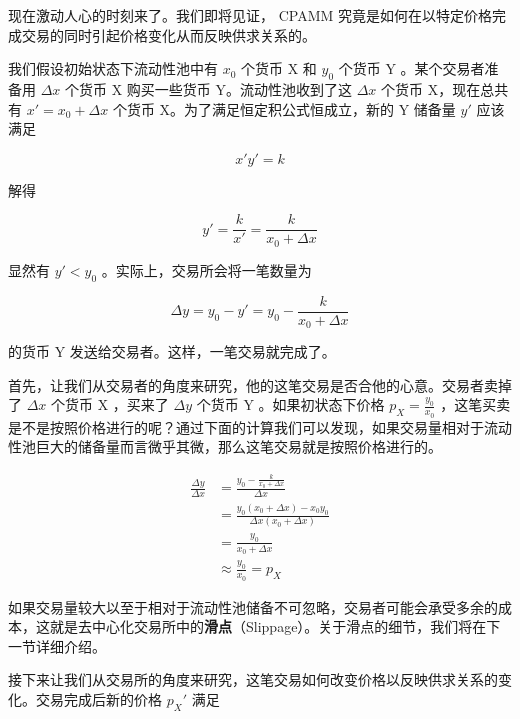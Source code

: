 \documentclass[12pt, a4paper, oneside]{ctexart}
\begin{document}
现在激动人心的时刻来了。我们即将见证， CPAMM 究竟是如何在以特定价格完成交易的同时引起价格变化从而反映供求关系的。

我们假设初始状态下流动性池中有 $x_0$ 个货币 X 和 $y_0$ 个货币 Y 。某个交易者准备用 $\Delta x$ 个货币 X 购买一些货币 Y。流动性池收到了这 $\Delta x$ 个货币 X，现在总共有 $x'=x_0+\Delta x$ 个货币 X。为了满足恒定积公式恒成立，新的 Y 储备量 $y'$ 应该满足

\begin{equation}
    x'y'=k
\end{equation}

\noindent 解得

\begin{equation}
    y'=\frac{k}{x'}=\frac{k}{x_0+\Delta x}
\end{equation}

\noindent 显然有 $y' < y_0$ 。实际上，交易所会将一笔数量为

\begin{equation}
    \Delta y = y_0 - y' = y_0 - \frac{k}{x_0+\Delta x}
\end{equation}

\noindent 的货币 Y 发送给交易者。这样，一笔交易就完成了。

首先，让我们从交易者的角度来研究，他的这笔交易是否合他的心意。交易者卖掉了 $\Delta x$ 个货币 X ，买来了 $\Delta y$ 个货币 Y 。如果初状态下价格 $\displaystyle p_X = \frac{y_0}{x_0}$ ，这笔买卖是不是按照价格进行的呢？通过下面的计算我们可以发现，如果交易量相对于流动性池巨大的储备量而言微乎其微，那么这笔交易就是按照价格进行的。

\begin{equation}
\begin{aligned}
    \frac{\Delta y}{\Delta x} 
    & = \frac{y_0-\frac{k}{x_0+\Delta x}}{\Delta x} \\
    & = \frac{y_0 (x_0+\Delta x) - x_0y_0}{\Delta x (x_0+\Delta x)} \\
    & = \frac{y_0}{x_0 + \Delta x} \\
    & \approx \frac{y_0}{x_0} = p_X
\end{aligned}
\end{equation}

如果交易量较大以至于相对于流动性池储备不可忽略，交易者可能会承受多余的成本，这就是去中心化交易所中的\textbf{滑点}（Slippage）。关于滑点的细节，我们将在下一节详细介绍。

接下来让我们从交易所的角度来研究，这笔交易如何改变价格以反映供求关系的变化。交易完成后新的价格 $p_X'$ 满足
\end{document}
